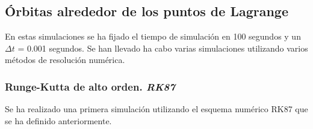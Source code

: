 \documentclass[12pt,a4paper]{article}
\begin{document}

\subsection{Órbitas alrededor de los puntos de Lagrange} %
En estas simulaciones se ha fijado el tiempo de simulación en 100 segundos y un $\Delta t$ = 0.001 segundos. Se han llevado ha cabo varias simulaciones utilizando varios métodos de resolución numérica.

\subsubsection{Runge-Kutta de alto orden. \textit{RK87}}
Se ha realizado una primera simulación utilizando el esquema numérico RK87 que se ha definido anteriormente.
\end{document}
